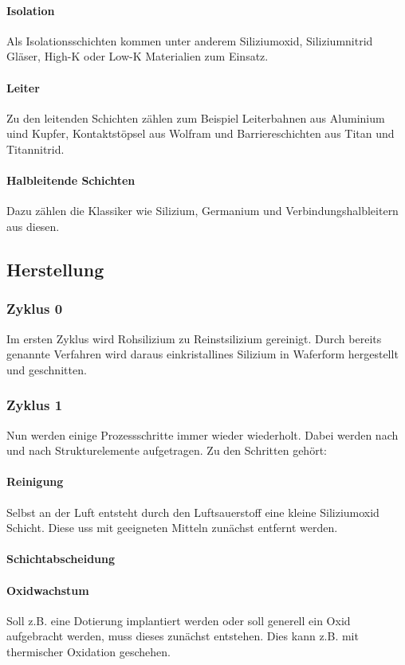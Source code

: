 	\paragraph{Isolation} Als Isolationsschichten kommen unter anderem Siliziumoxid, Siliziumnitrid Gläser, High-K oder Low-K Materialien zum Einsatz.
	
	\paragraph{Leiter} Zu den leitenden Schichten zählen zum Beispiel Leiterbahnen aus Aluminium uind Kupfer, Kontaktstöpsel aus Wolfram und Barriereschichten aus Titan und Titannitrid.
	
	\paragraph{Halbleitende Schichten} Dazu zählen die Klassiker wie Silizium, Germanium und Verbindungshalbleitern aus diesen.
	
\subsection{Herstellung}
	\subsubsection{Zyklus 0}
	Im ersten Zyklus wird Rohsilizium zu Reinstsilizium gereinigt. Durch bereits genannte Verfahren wird daraus einkristallines Silizium in Waferform hergestellt und geschnitten.
	\subsubsection{Zyklus 1}
	Nun werden einige Prozessschritte immer wieder wiederholt. Dabei werden nach und nach Strukturelemente aufgetragen. Zu den Schritten gehört:

	\paragraph{Reinigung} Selbst an der Luft entsteht durch den Luftsauerstoff eine kleine Siliziumoxid Schicht. Diese uss mit geeigneten Mitteln zunächst entfernt werden.
	
	\paragraph{Schichtabscheidung}  
	
	\paragraph{Oxidwachstum} Soll z.B. eine Dotierung implantiert werden oder soll  generell ein Oxid aufgebracht werden, muss dieses zunächst entstehen. Dies kann z.B. mit thermischer Oxidation geschehen.
	
